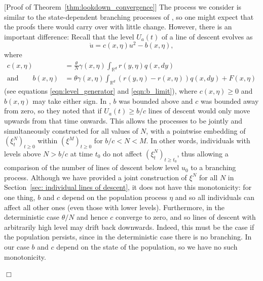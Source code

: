 \documentclass[12pt]{article}
\newenvironment {proof}{{\noindent\bf Proof }}{\hfill $\Box$ \medskip}
\newcommand{\IR}{\mathbb R}
\newcommand{\lp}{\xi}              %
\begin{document}
\begin{proof}[Proof of Theorem~\ref{thm:lookdown_convergence}]
    The process we consider is similar to the state-dependent branching processes
    of \citet{KR}, so one might expect that the proofs there would carry over with little change.
    However, there is an important difference:
    Recall that the level $U_a(t)$ of a line of descent evolves as
    $$
    \dot u 
    =
    c(x, \eta)
    u^2
    - b(x, \eta) ,
    $$
    where
    \begin{align*}
        c(x, \eta) &= \frac{\theta}{N} \gamma(x, \eta) \int_{\IR^d} r(y, \eta) q(x, dy) \\
        \text{and}\qquad
        b(x, \eta)
        &=
        \theta \gamma(x, \eta) \int_{\IR^d} \left(r(y, \eta) - r(x, \eta)\right) q(x, dy)
        + F(x, \eta) 
    \end{align*}
    (see equations \eqref{eqn:level_generator} and \eqref{eqn:b_limit}),
    where $c(x, \eta) \ge 0$ and $b(x, \eta)$ may take either sign.
    In \citet{kurtz/rodrigues:2011}, $b$ was bounded above and $c$ was bounded away from zero,
    so they noted that if $U_a(t) \ge b/c$
    lines of descent would only move upwards from that time onwards.
    This allows the processes to be jointly and simultaneously constructed
    for all values of $N$, with a pointwise embedding
    of $(\xi^N_t)_{t \ge 0}$ within $(\xi^{M})_{t \ge 0}$ for $b/c < N < M$.
    In other words, individuals with levels above $N > b/c$ at time $t_0$
    do not affect $(\lp^N_t)_{t \ge t_0}$,
    thus allowing a comparison of the number of lines of descent below level $u_0$
    to a branching process.
    Although we have provided a
    joint construction of $\lp^N$ for all $N$ in Section~\ref{sec: individual lines of descent},
    it does not have this monotonicity:
    for one thing, $b$ and $c$ depend on the population process $\eta$
    and so all individuals can affect all other ones (even those with lower levels).
    Furthermore, in the deterministic case $\theta/N$ and hence $c$ converge to zero,
    and so lines of descent with arbitrarily high level may drift back downwards.
    Indeed, this must be the case if the population persists,
    since in the deterministic case there is no branching.
    In our case $b$ and $c$ depend on the state of the population,
    so we have no such monotonicity.


\end{proof}
\end{document}
